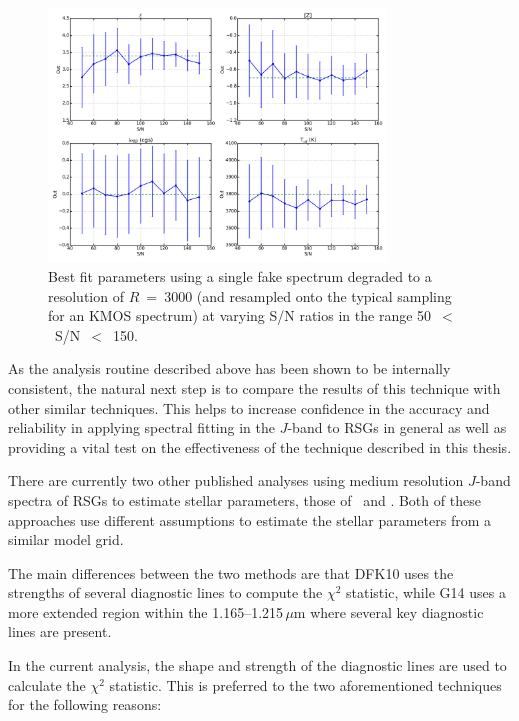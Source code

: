 \begin{figure}
 \centering
 \includegraphics[width=0.80\textwidth]{JAnal/Fakespec-tsnr-v1}
 \caption[Analysis test S/N]{
Best fit parameters using a single fake spectrum degraded to a resolution of $R$~=~3000 (and resampled onto the typical sampling for an KMOS spectrum) at varying S/N ratios in the range 50~$<$~S/N~$<$~150.
\label{fig:snr}
         }
\end{figure}


As the analysis routine described above has been shown to be internally consistent, the natural next step is to compare the results of this technique with other similar techniques.
This helps to increase confidence in the accuracy and reliability in applying spectral fitting in the $J$-band to RSGs in general as well as providing a vital test on the effectiveness of the technique described in this thesis.

There are currently two other published analyses using medium resolution $J$-band spectra of RSGs to estimate stellar parameters,
those of~\cite[][DFK10]{2010MNRAS.407.1203D} and
\cite[][G14]{2014PhDT.........G}.
Both of these approaches use different assumptions to estimate the stellar parameters from a similar model grid.

The main differences between the two methods are that DFK10 uses the strengths of several diagnostic lines to compute the $\chi^{2}$ statistic,
while G14 uses a more extended region within the 1.165--1.215\,$\mu$m where several key diagnostic lines are present.

In the current analysis, the shape and strength of the diagnostic lines are used to calculate the $\chi^{2}$ statistic.
This is preferred to the two aforementioned techniques for the following reasons:

